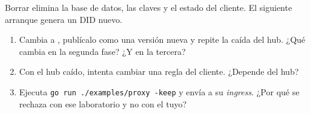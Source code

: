 Borrar  elimina la base de datos, las claves y el estado del cliente. El siguiente arranque genera un
DID nuevo.

\begin{retos}
\begin{enumerate}[leftmargin=*, itemsep=2pt]
  \item Cambia  a , publícalo como una versión nueva y repite la caída
        del hub. ¿Qué cambia en la segunda fase? ¿Y en la tercera?
  \item Con el hub caído, intenta cambiar una regla del cliente. ¿Depende del hub?
  \item Ejecuta \texttt{go run ./\allowbreak{}examples/\allowbreak{}proxy -keep} y envía  a su \emph{ingress}. ¿Por qué se
        rechaza con ese laboratorio y no con el tuyo?
\end{enumerate}
\end{retos}
